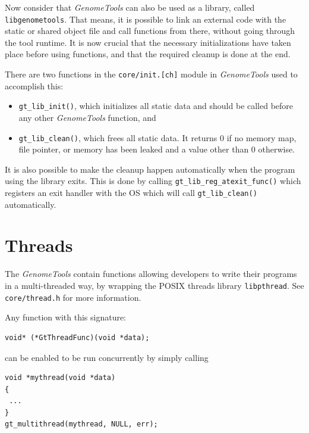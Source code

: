 \documentclass[11pt,final]{article}
\newcommand{\keyword}[1]{\lstinline{#1}}
\newcommand{\Gt}[0]{\emph{GenomeTools}\xspace}
\begin{document}
Now consider that \Gt can also be used as a library, called
\keyword{libgenometools}. That means, it is possible to link an external code
with the static or shared object file and call functions from there, without
going through the tool runtime. It is now crucial that the necessary
initializations have taken place before using functions, and that the required
cleanup is done at the end.

There are two functions in the \keyword{core/init.[ch]} module in \Gt used to
accomplish this:
\begin{itemize}
\item
\keyword{gt_lib_init()}, which initializes all static data and should be called
before any other \Gt function, and
\item
\keyword{gt_lib_clean()}, which frees all static data. It returns 0 if no
memory map, file pointer, or memory has been leaked and a value other than 0
otherwise.
\end{itemize}
It is also possible to make the cleanup happen automatically when the program
using  the library exits. This is done by calling
\keyword{gt_lib_reg_atexit_func()} which registers an exit handler with the OS
which will call \keyword{gt_lib_clean()} automatically.

\section{Threads}
The \Gt contain functions allowing developers to write their programs in a
multi-threaded way, by wrapping the POSIX threads library \keyword{libpthread}.
See \keyword{core/thread.h} for more information.

Any function with this signature:

\begin{lstlisting}
void* (*GtThreadFunc)(void *data);
\end{lstlisting}

can be enabled to be run concurrently by simply calling

\begin{lstlisting}
void *mythread(void *data)
{
 ...
}
gt_multithread(mythread, NULL, err);
\end{lstlisting}
\end{document}
